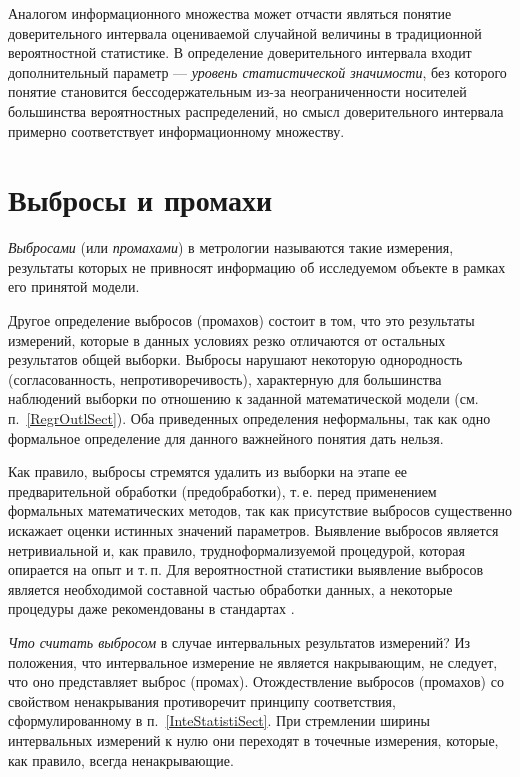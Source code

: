 \documentclass[a5paper,openany]{book}
\begin{document}
{Аналогом информационного множества может отчасти являться понятие доверительного 
интервала  оцениваемой случайной величины в традиционной вероятностной статистике. 
В определение доверительного интервала входит дополнительный параметр --- \emph{уровень 
статистической значимости}, без которого понятие становится бессодержательным из-за 
неограниченности носителей большинства вероятностных распределений, но смысл 
доверительного интервала примерно соответствует информационному множеству. 


\section{Выбросы и промахи} 
\label{OutlierSect}


\textit{Выбросами} (или \textit{промахами}) в метрологии называются такие измерения, 
результаты которых не привносят информацию об исследуемом объекте в рамках его 
принятой модели. 

Другое определение выбросов (промахов) состоит в том, что это результаты 
измерений, которые в данных условиях резко отличаются от остальных результатов общей 
выборки. Выбросы нарушают некоторую однородность (согласованность, непротиворечивость), 
характерную для большинства наблюдений выборки по отношению к заданной математической 
модели (см. п.~\ref{RegrOutlSect}). 
Оба приведенных определения неформальны, так как одно формальное 
определение для данного важнейного понятия дать нельзя.  

Как правило, выбросы стремятся удалить из выборки на этапе ее предварительной 
обработки (предобработки), т.\,е. перед применением  формальных 
математических методов, так как присутствие выбросов существенно искажает оценки 
истинных значений параметров. Выявление выбросов является нетривиальной и, как правило, 
трудноформализуемой процедурой, которая опирается на опыт и т.\,п. Для вероятностной 
статистики выявление выбросов является необходимой составной частью обработки данных, 
а некоторые процедуры даже рекомендованы в стандартах \cite{GOSTDirect}. 

\emph{Что считать выбросом} в случае интервальных результатов измерений? 
Из положения, что интервальное измерение не является 
накрывающим, не следует, что оно представляет выброс (промах). 
Отождествление выбросов (промахов) со свойством ненакрывания противоречит 
принципу соответствия, сформулированному в п.~\ref{InteStatistiSect}. При стремлении ширины интервальных измерений к нулю они переходят в точечные 
измерения, которые, как правило, всегда ненакрывающие. 

}
\end{document}
